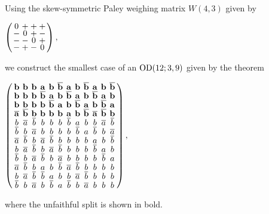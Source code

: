 \documentclass[../../../main]{subfiles}
\begin{document}
\begin{ex}
 Using the skew-symmetric Paley weighing matrix $W(4,3)$ given by
 \begin{defenum}
  \item $
  \arraycolsep=1.25pt\def\arraystretch{0.625}
  \left(\begin{array}{cccc}
  0&+&+&+\\
  -&0&+&-\\
  -&-&0&+\\
  -&+&-&0
  \end{array}\right),
  $
 \end{defenum}
 we construct the smallest case of an $\text{OD}(12; 3, 9)$ given by the theorem
 \begin{defenum}[resume]
  \item $
  \arraycolsep=2.0pt\def\arraystretch{0.5}
  \left(\begin{array}{cccccccccccc}
   \mathbf{b} & \mathbf{b} & \mathbf{b} & \mathbf{a} & \mathbf{b} & \mathbf{\bar b} & \mathbf{a} & \mathbf{b} & \mathbf{\bar b} & \mathbf{a} & \mathbf{b} & \mathbf{\bar b} \\
\mathbf{b} & \mathbf{b} & \mathbf{b} & \mathbf{\bar b} & \mathbf{a} & \mathbf{b} & \mathbf{\bar b} & \mathbf{a} & \mathbf{b} & \mathbf{\bar b} & \mathbf{a} & \mathbf{b} \\
\mathbf{b} & \mathbf{b} & \mathbf{b} & \mathbf{b} & \mathbf{\bar b} & \mathbf{a} & \mathbf{b} & \mathbf{\bar b} & \mathbf{a} & \mathbf{b} & \mathbf{\bar b} & \mathbf{a} \\
\mathbf{\bar a} & \mathbf{\bar b} & \mathbf{b} & \mathbf{b} & \mathbf{b} & \mathbf{b} & \mathbf{a} & \mathbf{b} & \mathbf{\bar b} & \mathbf{\bar a} & \mathbf{\bar b} & \mathbf{b} \\
b & \bar a & \bar b & b & b & b & \bar b & a & b & b & \bar a & \bar b \\
\bar b & b & \bar a & b & b & b & b & \bar b & a & \bar b & b & \bar a \\
\bar a & \bar b & b & \bar a & \bar b & b & b & b & b & a & b & \bar b \\
b & \bar a & \bar b & b & \bar a & \bar b & b & b & b & \bar b & a & b \\
\bar b & b & \bar a & \bar b & b & \bar a & b & b & b & b & \bar b & a \\
\bar a & \bar b & b & a & b & \bar b & \bar a & \bar b & b & b & b & b \\
b & \bar a & \bar b & \bar b & a & b & b & \bar a & \bar b & b & b & b \\
\bar b & b & \bar a & b & \bar b & a & \bar b & b & \bar a & b & b & b \\
  \end{array}\right),
  $
 \end{defenum}
 where the unfaithful split is shown in bold.
\end{ex}
\end{document}
